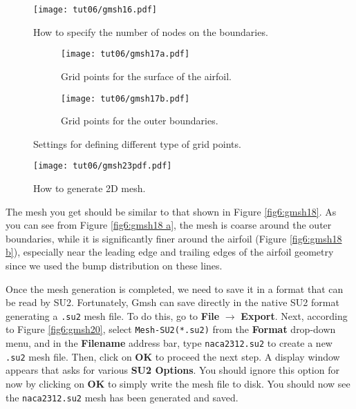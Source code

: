 \begin{figure}[ht]
    \centering
    \texttt{[image: tut06/gmsh16.pdf]}
    \caption{How to specify the number of nodes on the boundaries.}
    \label{fig6:gmsh16}
\end{figure}
\begin{figure}[ht]
    \centering
     \begin{subfigure}[b]{.4\textwidth}
         \centering
         \texttt{[image: tut06/gmsh17a.pdf]}
         \caption{Grid points for the surface of the airfoil.}
         \label{fig6:gmsh17 a}
     \end{subfigure}
     \hfill
     \begin{subfigure}[b]{.4\textwidth}
         \centering
         \texttt{[image: tut06/gmsh17b.pdf]}
         \caption{Grid points for the outer boundaries.}
         \label{fig6:gmsh17 b}
     \end{subfigure}  
    \caption{Settings for defining different type of grid points.}
    \label{fig6:gmsh17}
\end{figure}

\begin{figure}[ht]
    \centering
    \texttt{[image: tut06/gmsh23pdf.pdf]}
    \caption{How to generate 2D mesh.}
    \label{fig6:gmsh23}
\end{figure}
The mesh you get should be similar to that shown in Figure \ref{fig6:gmsh18}. As you can see from Figure \ref{fig6:gmsh18 a}, the mesh is coarse around the outer boundaries, while it is significantly finer around the airfoil (Figure \ref{fig6:gmsh18 b}), especially near the leading edge and trailing edges of the airfoil geometry since we used the bump distribution on these lines.

Once the mesh generation is completed, we need to save it in a format that can be read by SU2. Fortunately, Gmsh can save directly in the native SU2 format generating a \texttt{.su2} mesh file. To do this, go to \textbf{File} $\rightarrow$ \textbf{Export}. Next, according to Figure \ref{fig6:gmsh20}, select \texttt{Mesh-SU2(*.su2)} from the \textbf{Format} drop-down menu, and in the \textbf{Filename} address bar, type \texttt{naca2312.su2} to create a new \texttt{.su2} mesh file. Then, click on \textbf{OK} to proceed the next step. A display window appears that asks for various \textbf{SU2 Options}. You should ignore this option for now by clicking on \textbf{OK} to simply write the mesh file to disk. You should now see the \texttt{naca2312.su2} mesh has been generated and saved.

